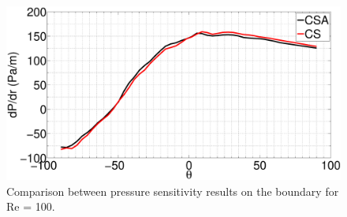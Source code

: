 %
\begin{figure}[H]
    \centering
    \includegraphics[width=12.00cm]{Chapter_4/figure/flow_over_cylinder/pressureSensitivityOnBoundary_RE100.eps}
    \caption{Comparison between pressure sensitivity results on the boundary for Re = 100.}
    \label{fig:C4_flowOverCylidner_pressureSensitivityOnSurface}
\end{figure}
%